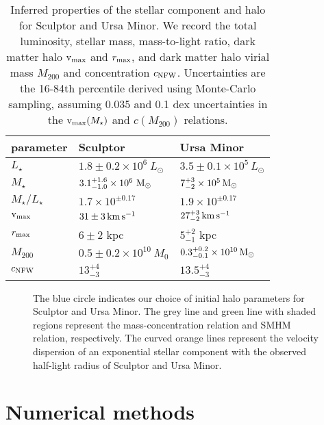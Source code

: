 \begin{table*}[t]
\centering
\caption[Derived Properties of Sculptor and Ursa Minor]{Inferred properties of the stellar component and halo for Sculptor and Ursa Minor. We record the total luminosity, stellar mass, mass-to-light ratio, dark matter halo ${\rm v}_{\rm max}$ and $r_{\rm max}$, and dark matter halo virial mass $M_{200}$ and concentration $c_{\rm NFW}$. Uncertainties are the 16-84th percentile derived using Monte-Carlo sampling, assuming 0.035 and 0.1 dex uncertainties in the ${\rm v}_{\rm max}(M_\star)$ and $c(M_{200})$ relations. }
\label{tbl:derived_props}
\begin{tabular}{lll}
\toprule
parameter & Sculptor & Ursa Minor\\
\midrule
$L_\star$ & $1.8\pm0.2\times10^6\ L_\odot$ & $3.5 \pm 0.1 \times 10^5\,L_\odot$\\
$M_\star$ & $3.1_{-1.0}^{+1.6} \times10^6\ {\rm M}_\odot$ & $7_{-2}^{+3} \times 10^5\,{\rm M}_{\odot}$\\
$M_\star / L_\star$ & $1.7\times 10^{\pm 0.17}$ & $1.9 \times 10^{\pm 0.17}$\\
${\rm v}_{\rm max}$ & $31\pm 3\,{\rm km\,s^{-1}}$ & $27_{-2}^{+3}\,{\rm km\,s^{-1}}$\\
$r_{\rm max}$ & $6 \pm 2$ kpc & $5_{-1}^{+2}$ kpc\\
$M_{200}$ & $0.5 \pm 0.2\times10^{10}\ M_0$ & $0.3_{-0.1}^{+0.2} \times 10^{10}\,{\rm M}_{\odot}$\\
$c_{\rm NFW}$ & $13_{-3}^{+4}$ & $13.5_{-3}^{+4}$\\
\bottomrule
\end{tabular}
\end{table*}

\begin{figure}
\centering
{}
\caption[Initial halo parameter choice]{The blue circle indicates our
choice of initial halo parameters for Sculptor and Ursa Minor. The grey
line and green line with shaded regions represent the
\citet{ludlow+2016} mass-concentration relation and \citet{fattahi+2018}
SMHM relation, respectively. The curved orange lines represent the
velocity dispersion of an exponential stellar component with the
observed half-light radius of Sculptor and Ursa
Minor.}\label{fig:scl_halos}
\end{figure}

\section{Numerical methods}\label{numerical-methods}

